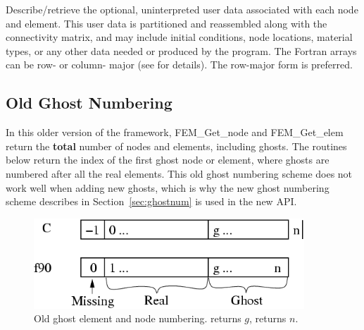 
     Describe/retrieve the optional, uninterpreted user data associated with
each node and element.  This user data is partitioned and reassembled along
with the connectivity matrix, and may include initial conditions, node locations,
material types, or any other data needed or produced by the program.   The Fortran
arrays can be row- or column- major (see  for
details).  The row-major form is preferred.



\subsection{Old Ghost Numbering}



In this older version of the framework, FEM\_Get\_node and FEM\_Get\_elem return the 
\textbf{total} number of nodes and elements, including ghosts. The routines below
return the index of the first ghost node or element, where ghosts are numbered
after all the real elements.  This old ghost numbering scheme does not work
well when adding new ghosts, which is why the new ghost numbering scheme
describes in Section~\ref{sec:ghostnum} is used in the new API.


\begin{figure}[h]
\begin{center}
\includegraphics[width=4in]{fig/conn_indexing_old}
\end{center}
\caption{Old ghost element and node numbering.   returns $g$,
 returns $n$.}
\label{fig:connold}
\end{figure}



